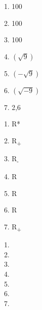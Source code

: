 \begin{multicols}{3}
\begin{enumerate}
\def\labelenumi{\alph{enumi}}
\item 100 
\item 100 
\item 100 
\item $(\sqrt{9}) 
$\item $(-\sqrt{9})$ 
\item $(\sqrt{- 9})$ 
\item 2,6 
\end{enumerate}


\begin{enumerate}
\item R*
\item R\textsubscript{+}
\item R\textsubscript{-}
\item R
\item R
\item R
\item R\textsubscript{+}
\end{enumerate}

\begin{enumerate}
\item {}
\item {}
\item {}
\item {}
\item {}
\item {}
\item {}
\end{enumerate}
\end{multicols}


